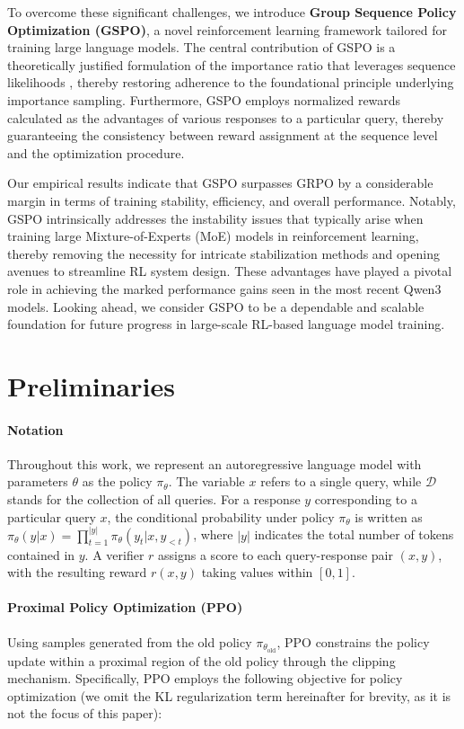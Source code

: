 To overcome these significant challenges, we introduce \textbf{Group Sequence Policy Optimization (GSPO)}, a novel reinforcement learning framework tailored for training large language models. The central contribution of GSPO is a theoretically justified formulation of the importance ratio that leverages sequence likelihoods \citep{click}, thereby restoring adherence to the foundational principle underlying importance sampling. Furthermore, GSPO employs normalized rewards calculated as the advantages of various responses to a particular query, thereby guaranteeing the consistency between reward assignment at the sequence level and the optimization procedure.

Our empirical results indicate that GSPO surpasses GRPO by a considerable margin in terms of training stability, efficiency, and overall performance. Notably, GSPO intrinsically addresses the instability issues that typically arise when training large Mixture-of-Experts (MoE) models in reinforcement learning, thereby removing the necessity for intricate stabilization methods and opening avenues to streamline RL system design. These advantages have played a pivotal role in achieving the marked performance gains seen in the most recent Qwen3 models. Looking ahead, we consider GSPO to be a dependable and scalable foundation for future progress in large-scale RL-based language model training.

\section{Preliminaries}

\paragraph{Notation}
Throughout this work, we represent an autoregressive language model with parameters $\theta$ as the policy $\pi_\theta$. The variable $x$ refers to a single query, while $\mathcal{D}$ stands for the collection of all queries. For a response $y$ corresponding to a particular query $x$, the conditional probability under policy $\pi_\theta$ is written as $\pi_\theta (y | x)=\prod_{t=1}^{|y|} \pi_\theta (y_t | x, y_{<t})$, where $|y|$ indicates the total number of tokens contained in $y$. A verifier $r$ assigns a score to each query-response pair $(x, y)$, with the resulting reward $r(x, y)$ taking values within $[0, 1]$.

\paragraph{Proximal Policy Optimization (PPO)} Using samples generated from the old policy $\pi_{\theta_\text{old}}$, PPO \citep{ppo} constrains the policy update within a proximal region of the old policy through the clipping mechanism. Specifically, PPO employs the following objective for policy optimization (we omit the KL regularization term hereinafter for brevity, as it is not the focus of this paper):

